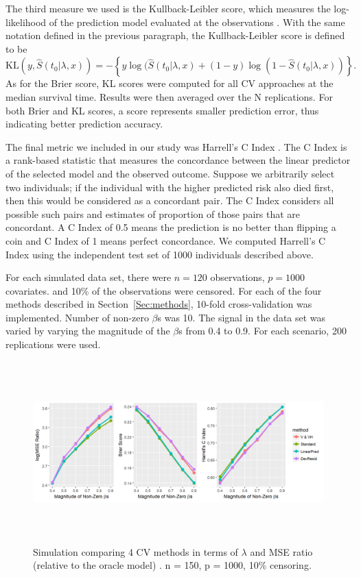 \par The third measure we used is the Kullback-Leibler score, which measures the log-likelihood of the prediction model evaluated at the observations \citep{VanHouwelingen2011}. With the same notation defined in the previous paragraph, the Kullback-Leibler score is defined to be
\begin{equation}
	\text{KL}(y, \hat{S}(t_0|\lambda,x)) = -\left\{ y\log(\hat{S}(t_0|\lambda,x) + (1 - y)\log(1 - \hat{S}(t_0|\lambda,x)) \right\}.
\end{equation}
As for the Brier score, KL scores were computed for all CV approaches at the median survival time.  Results were then averaged over the N replications. For both Brier and KL scores, a score represents smaller prediction error, thus indicating better prediction accuracy.

\par The final metric we included in our study was Harrell's C Index \citep{HarrellJr1984}. The C Index is a rank-based statistic that measures the concordance between the linear predictor of the selected model and the observed outcome. Suppose we arbitrarily select two individuals; if the individual with the higher predicted risk also died first, then this would be considered as a concordant pair. The C Index considers all possible such pairs and estimates of proportion of those pairs that are concordant. A C Index of 0.5 means the prediction is no better than flipping a coin and C Index of 1 means perfect concordance. We computed Harrell's C Index using the independent test set of 1000 individuals described above.

For each simulated data set, there were $n = 120$ observations, $p = 1000$ covariates. and 10\% of the observations were censored. For each of the four methods described in Section~\ref{Sec:methods}, 10-fold cross-validation was implemented. Number of non-zero $\beta$s was 10. The signal in the data set was varied by varying the magnitude of the $\beta$s from 0.4 to 0.9.  For each scenario, 200 replications were used. 
   
\begin{figure}[ht]
  \centering
  \includegraphics[height= 7cm ]{./figures/figure_2_new.png}
  \caption{\label{Fig:mse-brier-c} Simulation comparing 4 CV methods in terms of $\lambda$ and MSE ratio (relative to the oracle model) . n = 150, p = 1000, 10$\%$ censoring.}
\end{figure}	

